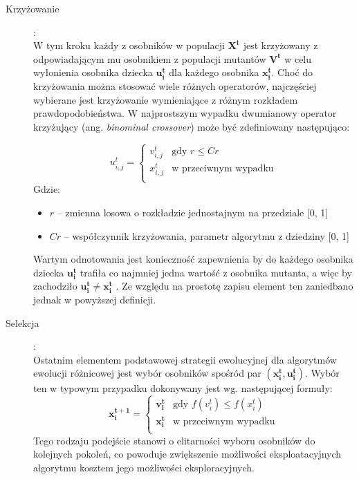 \documentclass[12pt,a4paper]{report}
\begin{document}
{{{\begin{description}
	  \item[Krzyżowanie]:\\
  W tym kroku każdy z osobników w populacji $\mathbf{X^{t}}$ jest krzyżowany z odpowiadającym mu osobnikiem z populacji mutantów $\mathbf{V^{t}}$ w celu wyłonienia osobnika dziecka $\mathbf{u_i^{t}}$ dla każdego osobnika $\mathbf{x_i^{t}}$. Choć do krzyżowania można stosować wiele różnych operatorów, najczęściej wybierane jest krzyżowanie wymieniające z różnym rozkładem prawdopodobieństwa. W najprostszym wypadku dwumianowy operator krzyżujący (ang. \emph{binominal crossover}) może być zdefiniowany następująco:
  
\begin{equation}
\label{eq:BasicCrossover}
u_{i,j}^{t} = \left\{ \begin{array}{ll}
v_{i,j}^{t} & \textrm{gdy $r \le Cr$}\\
x_{i,j}^{t} & \textrm{w przeciwnym wypadku}\\
\end{array} \right.
\end{equation}
Gdzie:
\begin{itemize}
\item $r$ -- zmienna losowa o rozkładzie jednostajnym na przedziale [0, 1]
\item $Cr$ -- współczynnik krzyżowania, parametr algorytmu z dziedziny [0, 1]
\end{itemize}
Wartym odnotowania jest konieczność zapewnienia by do każdego osobnika dziecka $\mathbf{u_i^{t}}$ trafiła co najmniej jedna wartość z osobnika mutanta, a więc by zachodziło $\mathbf{u_i^{t}} \neq \mathbf{x_i^{t}}$ \cite{SpringerIntroToEvol}. Ze względu na prostotę zapisu element ten zaniedbano jednak w powyższej definicji.


		\item[Selekcja]:\\
Ostatnim elementem podstawowej strategii ewolucyjnej dla algorytmów ewolucji różnicowej jest wybór osobników spośród par $(\mathbf{x_i^{t}}, \mathbf{u_i^{t}})$. Wybór ten w typowym przypadku dokonywany jest wg. następującej formuły:
$$
\mathbf{x_{i}^{t+1}} = \left\{ \begin{array}{ll}
\mathbf{v_{i}^{t}} & \textrm{gdy $f(v_i^t) \le f(x_i^t)$}\\
\mathbf{x_{i}^{t}} & \textrm{w przeciwnym wypadku}\\
\end{array} \right.
$$
Tego rodzaju podejście stanowi o elitarności wyboru osobników do kolejnych pokoleń, co powoduje zwiększenie możliwości eksploatacyjnych algorytmu kosztem jego możliwości eksploracyjnych.
\end{description}
}

}}
\end{document}
